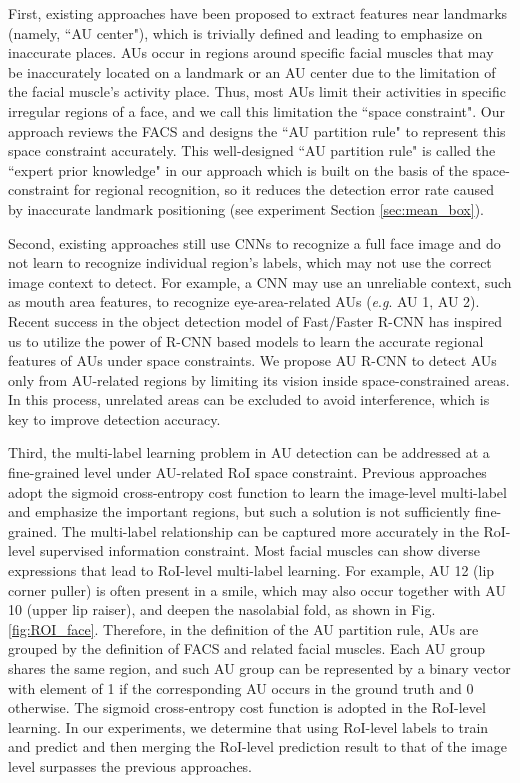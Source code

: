 \documentclass[5p,twocolumn]{elsarticle}
\newcommand{\eg}{\textit{e}.\textit{g}. }
\begin{document}
First, existing approaches \cite{eleftheriadis2015multi,koelstra2010dynamic,wang2013capturing,chu2013selective,ding2013facial,zeng2015confidence,liu2013aware,valstar2015fera,Zhao2016,li2017eac,li2017action} have been proposed to extract features near landmarks (namely, ``AU center"), which is trivially defined and leading to emphasize on inaccurate places. AUs occur in regions around specific facial muscles that may be inaccurately located on a landmark or an AU center due to the limitation of the facial muscle's activity place. Thus, most AUs limit their activities in specific irregular regions of a face, and we call this limitation the ``space constraint". Our approach reviews the FACS and designs the ``AU partition rule" to represent this space constraint accurately. This well-designed ``AU partition rule" is called the ``expert prior knowledge" in our approach which is built on the basis of the space-constraint for regional recognition, so it reduces the detection error rate caused by inaccurate landmark positioning (see experiment Section \ref{sec:mean_box}).

Second, existing approaches still use CNNs to recognize a full face image \cite{Zhao2016b,li2017eac,li2017action,han2017optimizing} and do not learn to recognize individual region's labels, which may not use the correct image context to detect. For example, a CNN may use an unreliable context, such as mouth area features, to recognize eye-area-related AUs (\eg AU 1, AU 2). Recent success in the object detection model of Fast/Faster R-CNN \cite{girshick2015fast,Ren2015} has inspired us to utilize the power of R-CNN based models to learn the accurate regional features of AUs under space constraints. We propose AU R-CNN to detect AUs only from AU-related regions by limiting its vision inside space-constrained areas. In this process, unrelated areas can be excluded to avoid interference, which is key to improve detection accuracy.

Third, the multi-label learning problem in AU detection can be addressed at a fine-grained level under AU-related RoI space constraint. Previous approaches \cite{Zhao2016b,li2017action,li2017eac} adopt the sigmoid cross-entropy cost function to learn the image-level multi-label and emphasize the important regions, but such a solution is not sufficiently fine-grained. The multi-label relationship can be captured more accurately in the RoI-level supervised information constraint. Most facial muscles can show diverse expressions that lead to RoI-level multi-label learning. For example, AU 12 (lip corner puller) is often present in a smile, which may also occur together with AU 10 (upper lip raiser), and deepen the nasolabial fold, as shown in Fig. \ref{fig:ROI_face}. Therefore, in the definition of the AU partition rule, AUs are grouped by the definition of FACS and related facial muscles. Each AU group shares the same region, and such AU group can be represented by a binary vector with element of 1 if the corresponding AU occurs in the ground truth and 0 otherwise. The sigmoid cross-entropy cost function is adopted in the RoI-level learning. In our experiments, we determine that using RoI-level labels to train and predict and then merging the RoI-level prediction result to that of the image level surpasses the previous approaches.
\end{document}
